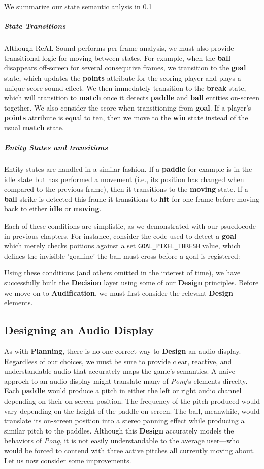 \documentclass{report}
\newcommand{\rs}{ReAL Sound\xspace}
\newcommand{\plan}{\textbf{Planning}\xspace}
\newcommand{\design}{\textbf{Design}\xspace}
\newcommand{\state}[1]{\textbf{#1}}
\newcommand{\decision}{\textbf{Decision}\xspace}
\newcommand{\audio}{\textbf{Audification}\xspace}
\newcommand{\pad}{\textbf{paddle}\xspace}
\newcommand{\ball}{\textbf{ball}\xspace}
\newcommand{\tech}[1]{\textbf{#1}}
\begin{document}
We summarize our state semantic anlysis in \ref{}


\subparagraph{State Transitions}
Although \rs performs per-frame analysis, we must also provide transitional logic for moving between states. For example, when the \ball disappears off-screen for several consequtive frames, we transition to the \state{goal} state, which updates the \tech{points} attribute for the scoring player and plays a unique score sound effect. We then immedately transition to the \state{break} state, which will transition to \state{match} once it detects \pad and \ball entities on-screen together. We also consider the score when transitioning from \state{goal}. If a player's \state{points} attribute is equal to ten, then we move to the \state{win} state instead of the usual \state{match} state.

\subparagraph{Entity States and transitions}
Entity states are handled in a similar fashion. If a \pad for example is in the idle state but has performed a movement (i.e., its position has changed when compared to the previous frame), then it transitions to the \state{moving} state. If a \ball strike is detected this frame it transitions to \state{hit} for one frame before moving back to either \state{idle} or \state{moving}.

Each of these conditions are simplistic, as we demonstrated with our psuedocode in previous chapters. For instance, consider the code used to detect a \state{goal}---which merely checks poitions against a set \texttt{GOAL\_PIXEL\_THRESH} value, which defines the invisible 'goalline' the ball must cross before a goal is registered:




Using these conditions (and others omitted in the interest of time), we have successfully built the \decision layer using some of our \design principles. Before we move on to \audio, we must first consider the relevant \design elements. 

\subsection{Designing an Audio Display}
As with \plan, there is no one correct way to \design an audio display. Regardless of our choices, we must be sure to provide clear, reactive, and understandable audio that accurately maps the game's semantics. A naive approch to an audio display might translate many of \emph{Pong}'s elements direclty. Each \pad would produce a pitch in either the left or right audio channel depending on their on-screen position. The frequency of the pitch produced would vary depending on the height of the paddle on screen. The ball, meanwhile, would translate its on-screen position into a stereo panning effect while producing a similar pitch to the paddles. Although this \design accurately models the behaviors of \emph{Pong}, it is not easily understandable to the average user---who would be forced to contend with three active pitches all currently moving about. Let us now consider some improvements.
\end{document}

